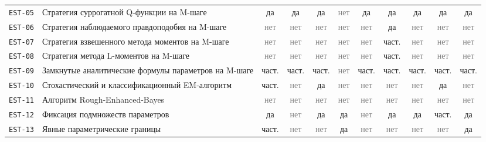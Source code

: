 \documentclass[10pt,a4paper]{article}
\begin{document}
\begin{landscape}
{\begin{longtable}{@{}l >{\raggedright\arraybackslash}p{8.0cm} *{9}{c}@{}}
\texttt{EST-05} & Стратегия суррогатной Q-функции на M-шаге & \cellcolor{yes!30}да & \cellcolor{yes!30}да & \cellcolor{yes!30}да & \textcolor{gray}{нет} & \cellcolor{yes!30}да & \cellcolor{yes!30}да & \cellcolor{yes!30}да & \cellcolor{yes!30}да & \cellcolor{yes!30}да \\
\texttt{EST-06} & Стратегия наблюдаемого правдоподобия на M-шаге & \textcolor{gray}{нет} & \textcolor{gray}{нет} & \textcolor{gray}{нет} & \textcolor{gray}{нет} & \textcolor{gray}{нет} & \cellcolor{yes!30}да & \textcolor{gray}{нет} & \textcolor{gray}{нет} & \textcolor{gray}{нет} \\
\texttt{EST-07} & Стратегия взвешенного метода моментов на M-шаге & \textcolor{gray}{нет} & \textcolor{gray}{нет} & \textcolor{gray}{нет} & \textcolor{gray}{нет} & \textcolor{gray}{нет} & \cellcolor{part!40}част. & \textcolor{gray}{нет} & \textcolor{gray}{нет} & \textcolor{gray}{нет} \\
\texttt{EST-08} & Стратегия метода L-моментов на M-шаге & \textcolor{gray}{нет} & \textcolor{gray}{нет} & \textcolor{gray}{нет} & \textcolor{gray}{нет} & \textcolor{gray}{нет} & \cellcolor{part!40}част. & \textcolor{gray}{нет} & \textcolor{gray}{нет} & \textcolor{gray}{нет} \\
\texttt{EST-09} & Замкнутые аналитические формулы параметров на M-шаге & \cellcolor{part!40}част. & \cellcolor{part!40}част. & \cellcolor{part!40}част. & \textcolor{gray}{нет} & \cellcolor{part!40}част. & \cellcolor{part!40}част. & \cellcolor{part!40}част. & \cellcolor{part!40}част. & \cellcolor{part!40}част. \\
\texttt{EST-10} & Стохастический и классификационный EM-алгоритм & \cellcolor{part!40}част. & \textcolor{gray}{нет} & \cellcolor{yes!30}да & \textcolor{gray}{нет} & \textcolor{gray}{нет} & \textcolor{gray}{нет} & \textcolor{gray}{нет} & \cellcolor{yes!30}да & \textcolor{gray}{нет} \\
\texttt{EST-11} & Алгоритм Rough-Enhanced-Bayes & \textcolor{gray}{нет} & \textcolor{gray}{нет} & \textcolor{gray}{нет} & \textcolor{gray}{нет} & \textcolor{gray}{нет} & \textcolor{gray}{нет} & \textcolor{gray}{нет} & \textcolor{gray}{нет} & \textcolor{gray}{нет} \\
\texttt{EST-12} & Фиксация подмножеств параметров & \cellcolor{yes!30}да & \textcolor{gray}{нет} & \cellcolor{yes!30}да & \cellcolor{yes!30}да & \textcolor{gray}{нет} & \cellcolor{yes!30}да & \cellcolor{yes!30}да & \cellcolor{part!40}част. & \cellcolor{yes!30}да \\
\texttt{EST-13} & Явные параметрические границы & \cellcolor{part!40}част. & \textcolor{gray}{нет} & \textcolor{gray}{нет} & \cellcolor{yes!30}да & \textcolor{gray}{нет} & \textcolor{gray}{нет} & \textcolor{gray}{нет} & \textcolor{gray}{нет} & \cellcolor{yes!30}да \\

\end{longtable}}
\end{landscape}
\end{document}
